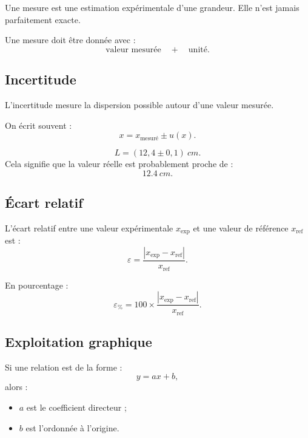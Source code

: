 \documentclass[11pt,a4paper]{article}
\begin{document}
\begin{definition}
Une mesure est une estimation expérimentale d'une grandeur.  
Elle n'est jamais parfaitement exacte.
\end{definition}

Une mesure doit être donnée avec :
\[
\text{valeur mesurée} \quad + \quad \text{unité}.
\]

\subsection{Incertitude}

\begin{definition}
L'incertitude mesure la dispersion possible autour d'une valeur mesurée.
\end{definition}

On écrit souvent :
\[
x=x_{\text{mesuré}}\pm u(x).
\]

\begin{exemple}
\[
L=(12{,}4\pm0{,}1)\ \si{cm}.
\]
Cela signifie que la valeur réelle est probablement proche de :
\[
\SI{12.4}{cm}.
\]
\end{exemple}

\subsection{Écart relatif}

\begin{definition}
L'écart relatif entre une valeur expérimentale $x_{\text{exp}}$ et une valeur de référence $x_{\text{ref}}$ est :
\[
\varepsilon=\frac{|x_{\text{exp}}-x_{\text{ref}}|}{x_{\text{ref}}}.
\]
\end{definition}

En pourcentage :
\[
\varepsilon_{\%}=100\times \frac{|x_{\text{exp}}-x_{\text{ref}}|}{x_{\text{ref}}}.
\]

\subsection{Exploitation graphique}

\begin{methode}
Si une relation est de la forme :
\[
y=ax+b,
\]
alors :
\begin{itemize}
  \item $a$ est le coefficient directeur ;
  \item $b$ est l'ordonnée à l'origine.
\end{itemize}
\end{methode}
\end{document}
